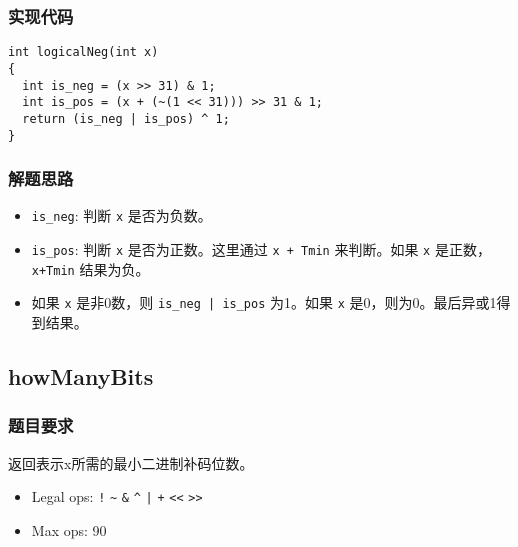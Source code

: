 \documentclass{article}
\begin{document}
\subsubsection{实现代码}
\begin{lstlisting}[caption={logicalNeg}]
int logicalNeg(int x)
{
  int is_neg = (x >> 31) & 1;
  int is_pos = (x + (~(1 << 31))) >> 31 & 1;
  return (is_neg | is_pos) ^ 1;
}
\end{lstlisting}

\subsubsection{解题思路}
\begin{itemize}
    \item \texttt{is\_neg}: 判断 \texttt{x} 是否为负数。
    \item \texttt{is\_pos}: 判断 \texttt{x} 是否为正数。这里通过 \texttt{x + Tmin} 来判断。如果 \texttt{x} 是正数，\texttt{x+Tmin} 结果为负。
    \item 如果 \texttt{x} 是非0数，则 \texttt{is\_neg | is\_pos} 为1。如果 \texttt{x} 是0，则为0。最后异或1得到结果。
\end{itemize}

\subsection{howManyBits}
\subsubsection{题目要求}
返回表示x所需的最小二进制补码位数。
\begin{itemize}
    \item Legal ops: \texttt{!} \texttt{\~{}} \texttt{\&} \texttt{\^{}} \texttt{|} \texttt{+} \texttt{<<} \texttt{>>}
    \item Max ops: 90
\end{itemize}
\end{document}
